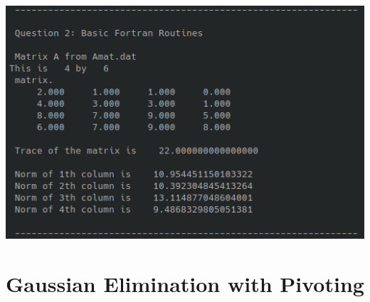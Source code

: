 \documentclass{article}
\begin{document}
\begin{enumerate}
\begin{center}
    \includegraphics[width = .6\textwidth]{files/Q2sol.png}
\end{center}

\end{enumerate}

\section{Gaussian Elimination with Pivoting}
\end{document}
